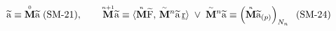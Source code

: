 \documentclass[preview]{standalone}
\begin{document}
\begin{align*}
\special{dvisvgm:raw <g id='unique000'>}\widetilde{\mathrm{a}} \equiv \overset{\scriptscriptstyle 0}{\mathbf{M}}\widetilde{\mathrm{a}}\;(\text{SM-21}), \qquad \overset{\scriptscriptstyle n+1}{\mathbf{M}}\widetilde{\mathrm{a}} \equiv \langle \overset{\scriptscriptstyle n}{\mathbf{M}}\widetilde{\mathrm{F}},\, \overset{\scriptscriptstyle\sim}{\mathbf{M}}{}^n\widetilde{\mathrm{a}}\,\underline{\mathrm{r}}\rangle \;\lor\; \overset{\scriptscriptstyle\sim}{\mathbf{M}}{}^n\widetilde{\mathrm{a}} \equiv \left(\overset{\scriptscriptstyle n}{\mathbf{M}}\widetilde{\mathrm{a}}_{(p)}\right)_{N_n}\;\;(\text{SM-24})\special{dvisvgm:raw </g>}
\end{align*}
\end{document}
